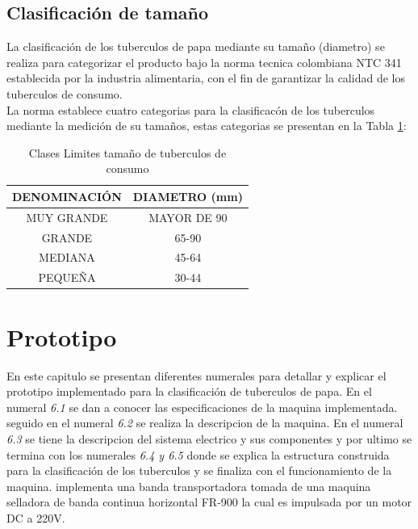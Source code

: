 	\section{Clasificación de tamaño}
		La clasificación de los tuberculos de papa mediante su tamaño (diametro) se realiza para categorizar el producto bajo la norma tecnica colombiana NTC 341 establecida por la industria alimentaria, con el fin de garantizar la calidad de los tuberculos de consumo.
		\\
		La norma establece cuatro categorias para la clasificacón de los tuberculos mediante la medición de su tamaños, estas categorias se presentan en la Tabla \ref{table:limites}:
		
	\begin{table}[ht]
		\centering
		\begin{tabular}{|c|c|}
			\hline
			DENOMINACIÓN & DIAMETRO (mm) \\
			\hline
			MUY GRANDE & MAYOR DE 90 \\
			\hline
			GRANDE & 65-90 \\
			\hline
			MEDIANA	& 45-64 \\
			\hline
			PEQUEÑA & 30-44 \\
			\hline
		\end{tabular}	
		\caption{Clases Limites tamaño de tuberculos de consumo}
		\label{table:limites}
	\end{table}	
	
	
\chapter{Prototipo}
	En este capitulo se presentan diferentes numerales para detallar y explicar el prototipo implementado para la clasificación de tuberculos de papa. En el numeral \textit{6.1} se dan a conocer las especificaciones de la maquina implementada. seguido en el numeral \textit{6.2} se realiza la descripcion de la maquina. En el numeral \textit{6.3} se tiene la descripcion del sistema electrico y sus componentes y por ultimo se termina con los numerales \textit{6.4 y 6.5} donde se explica la estructura construida para la clasificación de los tuberculos y se finaliza con el funcionamiento de la maquina. implementa una banda transportadora tomada de una maquina selladora de banda continua horizontal FR-900 la cual es impulsada por un motor DC a 220V.
	
